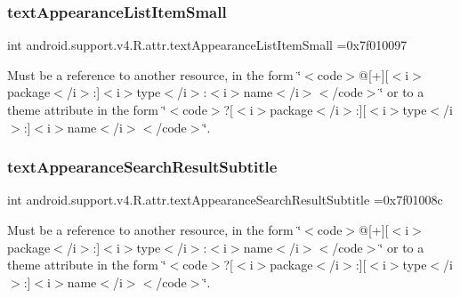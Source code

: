 \subsubsection{\texorpdfstring{text\+Appearance\+List\+Item\+Small}{textAppearanceListItemSmall}}
{\footnotesize\ttfamily int android.\+support.\+v4.\+R.\+attr.\+text\+Appearance\+List\+Item\+Small =0x7f010097\hspace{0.3cm}{\ttfamily [static]}}

Must be a reference to another resource, in the form \char`\"{}$<$code$>$@\mbox{[}+\mbox{]}\mbox{[}$<$i$>$package$<$/i$>$\+:\mbox{]}$<$i$>$type$<$/i$>$\+:$<$i$>$name$<$/i$>$$<$/code$>$\char`\"{} or to a theme attribute in the form \char`\"{}$<$code$>$?\mbox{[}$<$i$>$package$<$/i$>$\+:\mbox{]}\mbox{[}$<$i$>$type$<$/i$>$\+:\mbox{]}$<$i$>$name$<$/i$>$$<$/code$>$\char`\"{}. \mbox{\label{classandroid_1_1support_1_1v4_1_1R_1_1attr_ab65ed23c9eed16cf42d91ea4e8e70946}} 
\subsubsection{\texorpdfstring{text\+Appearance\+Search\+Result\+Subtitle}{textAppearanceSearchResultSubtitle}}
{\footnotesize\ttfamily int android.\+support.\+v4.\+R.\+attr.\+text\+Appearance\+Search\+Result\+Subtitle =0x7f01008c\hspace{0.3cm}{\ttfamily [static]}}

Must be a reference to another resource, in the form \char`\"{}$<$code$>$@\mbox{[}+\mbox{]}\mbox{[}$<$i$>$package$<$/i$>$\+:\mbox{]}$<$i$>$type$<$/i$>$\+:$<$i$>$name$<$/i$>$$<$/code$>$\char`\"{} or to a theme attribute in the form \char`\"{}$<$code$>$?\mbox{[}$<$i$>$package$<$/i$>$\+:\mbox{]}\mbox{[}$<$i$>$type$<$/i$>$\+:\mbox{]}$<$i$>$name$<$/i$>$$<$/code$>$\char`\"{}. \mbox{\label{classandroid_1_1support_1_1v4_1_1R_1_1attr_a4b4c9e0256dc86743a3c07371ce817bd}} 
